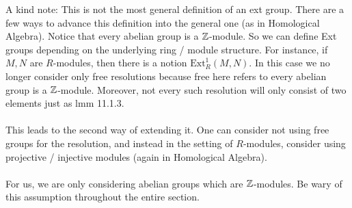 \documentclass[a4paper]{article}
\begin{document}
A kind note: This is not the most general definition of an ext group. There are a few ways to advance this definition into the general one (as in Homological Algebra). Notice that every abelian group is a $\mathbb{Z}$-module. So we can define Ext groups depending on the underlying ring / module structure. For instance, if $M,N$ are $R$-modules, then there is a notion $\text{Ext}_R^1(M,N)$. In this case we no longer consider only free resolutions because free here refers to every abelian group is a $\mathbb{Z}$-module. Moreover, not every such resolution will only consist of two elements just as lmm 11.1.3. \\~\\

This leads to the second way of extending it. One can consider not using free groups for the resolution, and instead in the setting of $R$-modules, consider using projective / injective modules (again in Homological Algebra). \\~\\

For us, we are only considering abelian groups which are $\mathbb{Z}$-modules. Be wary of this assumption throughout the entire section. 
\end{document}
